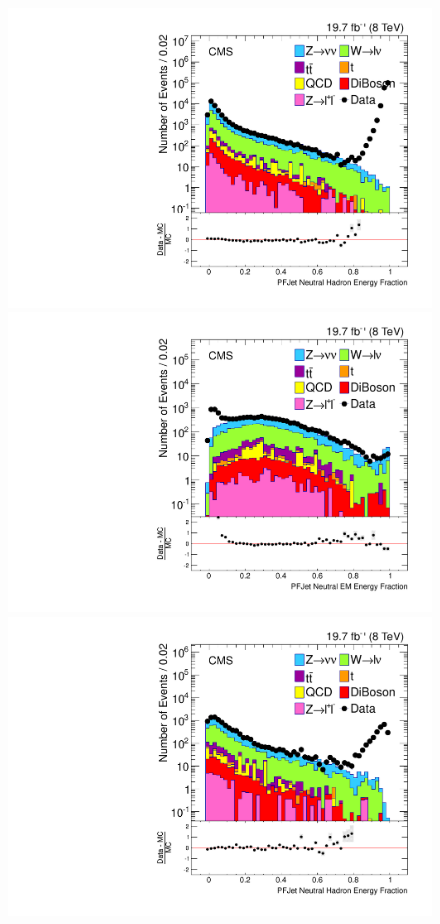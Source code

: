 \begin{figure}[!Hhtb]
\begin{center}
  \includegraphics[scale=0.30]     {Figures/sus13009/nocut/PFAK5JetNeuHadEngFrac.pdf}
  \includegraphics[scale=0.30]     {Figures/sus13009/nocut/PFAK5JetNeuEmEngFrac2.pdf}
  \includegraphics[scale=0.30]     {Figures/sus13009/nocut/PFAK5JetNeuHadEngFrac2.pdf}

\end{center}
\end{figure}
